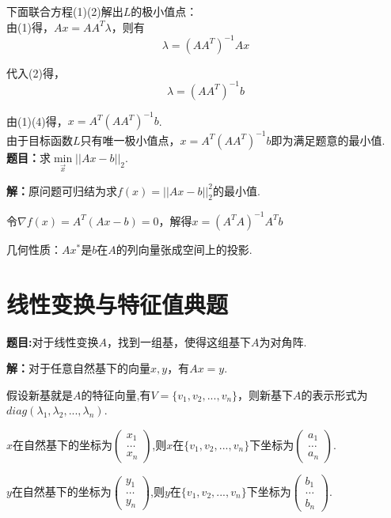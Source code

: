 \documentclass{article}
\begin{document}
下面联合方程(1)(2)解出$L$的极小值点：\\

由(1)得，$Ax=AA^T\lambda$，则有\begin{equation*}
    \lambda = (AA^T)^{-1}Ax
\end{equation*}

代入(2)得，\begin{equation*}
    \lambda = (AA^T)^{-1}b
\end{equation*}

由(1)(4)得，$x=A^T(AA^T)^{-1}b$.\\

由于目标函数$L$只有唯一极小值点，$x=A^T(AA^T)^{-1}b$即为满足题意的最小值.\\

\textbf{题目：}求$\mathop{min}\limits_{\vec{x}}||Ax-b||_2$.

\textbf{解：}原问题可归结为求$f(x)=||Ax-b||^2_2$的最小值.

令$\nabla f(x)=A^T(Ax-b)=0$，解得$x=(A^TA)^{-1}A^Tb$

几何性质：$Ax^*$是$b$在$A$的列向量张成空间上的投影.

\section{线性变换与特征值典题}
\textbf{题目:}对于线性变换$A$，找到一组基，使得这组基下$A$为对角阵.

\textbf{解：}对于任意自然基下的向量$x,y$，有$Ax=y$.

假设新基就是$A$的特征向量,有$V=\{v_1,v_2,...,v_n\}$，则新基下$A$的表示形式为$diag(\lambda_1,\lambda_2,...,\lambda_n)$.

$x$在自然基下的坐标为$\left(
    \begin{array}{c}
        x_1 \\
        \dots \\
        x_n
    \end{array}
\right)$,则$x$在$\{v_1,v_2,...,v_n\}$下坐标为$\left(
    \begin{array}{c}
        a_1 \\
        \dots \\
        a_n
    \end{array}
\right)$.

$y$在自然基下的坐标为$\left(
    \begin{array}{c}
        y_1 \\
        \dots \\
        y_n
    \end{array}
\right)$,则$y$在$\{v_1,v_2,...,v_n\}$下坐标为$\left(
    \begin{array}{c}
        b_1 \\
        \dots \\
        b_n
    \end{array}
\right)$.
\end{document}
